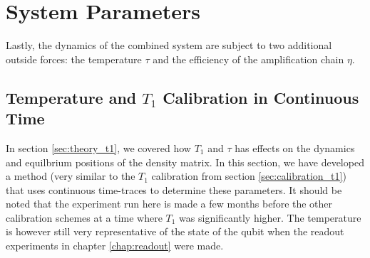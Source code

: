 

\section{System Parameters}
Lastly, the dynamics of the combined system are subject to two additional outside forces: the temperature $\tau$ and the efficiency of the amplification chain $\eta$.


\subsection{Temperature and $T_1$ Calibration in Continuous Time}\label{sec:continuous_calibratino}
In section \ref{sec:theory_t1}, we covered how $T_1$ and $\tau$ has effects on the dynamics and equilbrium positions of the density matrix. In this section, we have developed a method (very similar to the $T_1$ calibration from section \ref{sec:calibration_t1}) that uses continuous time-traces to determine these parameters. It should be noted that the experiment run here is made a few months before the other calibration schemes at a time where $T_1$ was significantly higher. The temperature is however still very representative of the state of the qubit when the readout experiments in chapter \ref{chap:readout} were made.



